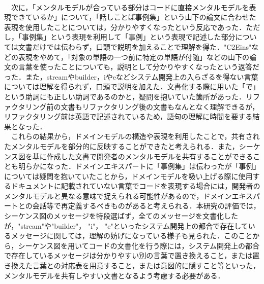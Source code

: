 \documentclass[12pt, a4paper]{jreport}
\begin{document}
\\　次に，「メンタルモデルが合っている部分はコードに直接メンタルモデルを表現できているか」について，「話しことば事例集」という山下の論文に合わせた表現を使用したことについては，分かりやすくなったという反応であった．ただし，「事例集」という表現を利用して「事例」という表現で記述した部分については文書だけでは伝わらず，口頭で説明を加えることで理解を得た．"C2Eins"などの表現をやめて，「対象の単語の一つ前に特定の単語が付随」などの山下の論文の言葉を使ったことについても，説明として分かりやすくなったという返答だった．また，streamやbuilder，iやeなどシステム開発上の入らざるを得ない言葉については理解を得られず，口頭で説明を加えた．文書化する際に用いた「で」という助詞にも正しい助詞であるのかと，疑問を抱いていた箇所があった．リファクタリング前の文書もリファクタリング後の文書もなんとなく理解できるが，リファクタリング前は英語で記述されているため，語句の理解に時間を要する結果となった．
\\　これらの結果から，ドメインモデルの構造や表現を利用したことで，共有されたメンタルモデルを部分的に反映することができたと考えられる．また，シーケンス図を基に作成した文書で開発者のメンタルモデルを共有することができることも明らかになった．ドメインエキスパートに「事例集」は伝わったが「事例」については疑問を抱いていたことから，ドメインモデルを吸い上げる際に使用するドキュメントに記載されていない言葉でコードを表現する場合には，開発者のメンタルモデルと異なる意味で捉えられる可能性があるので，ドメインエキスパートとの会話等で再定義するべきものがあると考えられる．本研究の評価では，シーケンス図のメッセージを特段選ばず，全てのメッセージを文書化したが，"stream"や"builder"， "i"， "e"といったシステム開発上の都合で存在しているメッセージに関しては，理解の妨げになっている様子も見られた．このことから，シーケンス図を用いてコードの文書化を行う際には，システム開発上の都合で存在しているメッセージは分かりやすい別の言葉で置き換えること，または置き換えた言葉との対応表を用意すること，または意図的に隠すこと等といった，メンタルモデルを共有しやすい文書となるよう考慮する必要がある．
\end{document}
